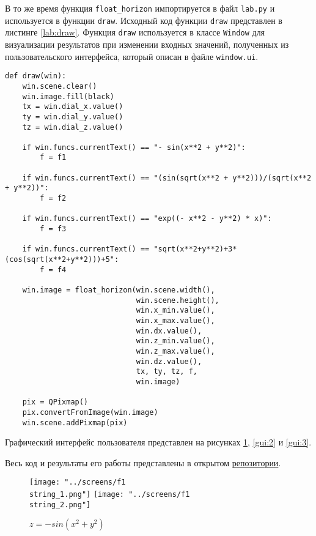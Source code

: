 \documentclass[oneside,final,14pt]{extreport}
\begin{document}
В то же время функция \texttt{float_horizon} импортируется в файл \texttt{lab.py} и используется в функции \texttt{draw}. Исходный код функции \texttt{draw} представлен в листинге \ref{lab:draw}. Функция \texttt{draw} используется в классе \texttt{Window} для визуализации результатов при изменении входных значений, полученных из пользовательского интерфейса, который описан в файле \texttt{window.ui}. 

\begin{lstlisting}[caption = Функция \texttt{draw} -- визуализация результатов, label = lab:draw]
def draw(win):
    win.scene.clear()
    win.image.fill(black)
    tx = win.dial_x.value()
    ty = win.dial_y.value()
    tz = win.dial_z.value()

    if win.funcs.currentText() == "- sin(x**2 + y**2)":
        f = f1

    if win.funcs.currentText() == "(sin(sqrt(x**2 + y**2)))/(sqrt(x**2 + y**2))":
        f = f2

    if win.funcs.currentText() == "exp((- x**2 - y**2) * x)":
        f = f3

    if win.funcs.currentText() == "sqrt(x**2+y**2)+3*(cos(sqrt(x**2+y**2)))+5":
        f = f4

    win.image = float_horizon(win.scene.width(), 
                              win.scene.height(), 
                              win.x_min.value(), 
                              win.x_max.value(), 
                              win.dx.value(),
                              win.z_min.value(), 
                              win.z_max.value(), 
                              win.dz.value(), 
                              tx, ty, tz, f, 
                              win.image)

    pix = QPixmap()
    pix.convertFromImage(win.image)
    win.scene.addPixmap(pix)
\end{lstlisting}

Графический интерфейс пользователя представлен на рисунках \ref{gui:1}, \ref{gui:2} и \ref{gui:3}.

Весь код и результаты его работы представлены в открытом \href{https://github.com/morozov6420/floating_horizon_algorithm}{репозитории}.

\begin{figure}[ht]
    \texttt{[image: "../screens/f1\\string\_1.png"]}
    \endminipage\hfill
    \texttt{[image: "../screens/f1\\string\_2.png"]}
    \endminipage\hfill
    \caption{\(z=-sin\left(x^2 + y^2\right)\)}
    \label{gui:1}
\end{figure}
\end{document}
